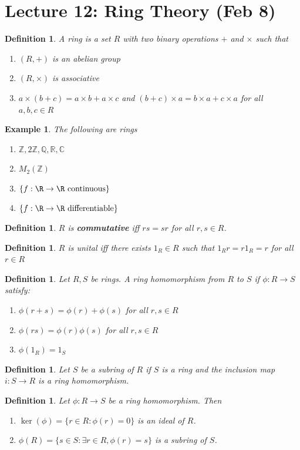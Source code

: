 \documentclass[a4paper,12pt]{article}
\newtheorem{defn}[thm]{Definition}
\newtheorem{eg}[thm]{Example}
\begin{document}
\section{Lecture 12: Ring Theory (Feb 8)}
\begin{defn}
    A ring is a set $R$ with two binary operations $+$ and $\times$ such that \begin{enumerate}
        \item $(R,+)$ is an abelian group
        \item $(R,\times)$ is associative
        \item $a\times (b+c)=a\times b+a\times c$ and $(b+c)\times a=b\times a+c\times a$ for all $a,b,c\in R$
    \end{enumerate}
\end{defn}
\begin{eg}
    The following are rings
    \begin{enumerate}
        \item $\mathbb{Z}, 2\mathbb{Z}, \mathbb{Q}, \mathbb{R}, \mathbb{C}$
        \item $M_2(\mathbb{Z})$
        \item $ \{f: \R\to \R \text{ continuous}\}$
        \item $ \{f: \R\to \R \text{ differentiable}\}$
    \end{enumerate}
\end{eg}
\begin{defn}
    $R$ is \textbf{commutative} iff $rs=sr$ for all $r,s\in R$.
\end{defn}
\begin{defn}
    $R$ is unital iff there exists $1_R\in R$ such that $1_R r=r1_R=r$ for all $r\in R$
\end{defn}
\begin{defn}
    Let $R,S$ be rings. A ring homomorphism from $R$ to $S$ if $\phi:R\to S$ satisfy:
    \begin{enumerate}
        \item $\phi(r+s)=\phi(r)+\phi(s)$ for all $r,s\in R$
        \item $\phi(rs)=\phi(r)\phi(s)$ for all $r,s\in R$
        \item $\phi(1_R)=1_S$
    \end{enumerate}
\end{defn}
\begin{defn}
    Let $S$ be a subring of $R$ if $S$ is a ring and the inclusion map $i:S\to R$ is a ring homomorphism.
\end{defn}
\begin{defn}
    Let $\phi:R\to S$ be a ring homomorphism. Then
    \begin{enumerate}
        \item $\ker(\phi)=\{r\in R: \phi(r)=0\}$ is an \emph{ideal} of $R$.
        \item $\phi(R)=\{s\in S: \exists r\in R, \phi(r)=s\}$ is a subring of $S$.
    \end{enumerate}
\end{defn}
\end{document}
